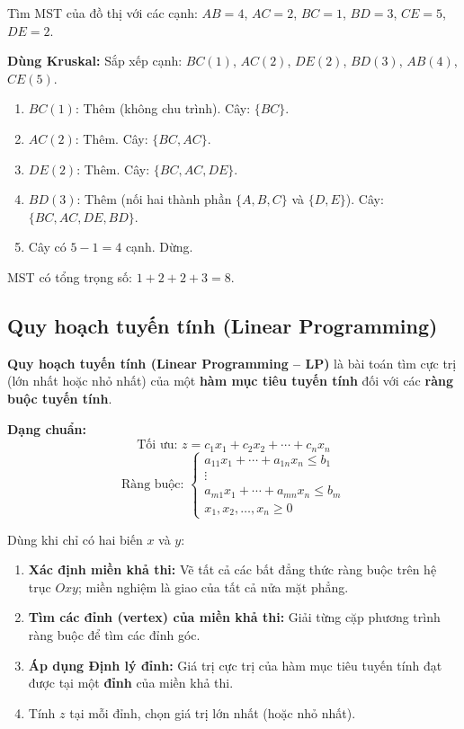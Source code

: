 \documentclass[12pt,a4paper]{article}
\begin{document}
\begin{vidu}
  Tìm MST của đồ thị với các cạnh: $AB=4$, $AC=2$, $BC=1$, $BD=3$, $CE=5$, $DE=2$.

  \medskip\textbf{Dùng Kruskal:}
  Sắp xếp cạnh: $BC(1)$, $AC(2)$, $DE(2)$, $BD(3)$, $AB(4)$, $CE(5)$.
  \begin{enumerate}
    \item $BC(1)$: Thêm (không chu trình). Cây: $\{BC\}$.
    \item $AC(2)$: Thêm. Cây: $\{BC, AC\}$.
    \item $DE(2)$: Thêm. Cây: $\{BC, AC, DE\}$.
    \item $BD(3)$: Thêm (nối hai thành phần $\{A,B,C\}$ và $\{D,E\}$). Cây: $\{BC, AC, DE, BD\}$.
    \item Cây có $5-1=4$ cạnh. Dừng.
  \end{enumerate}
  MST có tổng trọng số: $1+2+2+3 = 8$.
\end{vidu}

\subsection{Quy hoạch tuyến tính (Linear Programming)}

\begin{dinhnghia}[title={Bài toán quy hoạch tuyến tính}]
  \textbf{Quy hoạch tuyến tính (Linear Programming -- LP)} là bài toán tìm cực trị (lớn nhất hoặc nhỏ nhất) của một \textbf{hàm mục tiêu tuyến tính} đối với các \textbf{ràng buộc tuyến tính}.

  \textbf{Dạng chuẩn:}
  \[
    \text{Tối ưu: } z = c_1 x_1 + c_2 x_2 + \cdots + c_n x_n
  \]
  \[
    \text{Ràng buộc: } \begin{cases} a_{11}x_1 + \cdots + a_{1n}x_n \le b_1 \\ \vdots \\ a_{m1}x_1 + \cdots + a_{mn}x_n \le b_m \\ x_1, x_2, \ldots, x_n \ge 0 \end{cases}
  \]
\end{dinhnghia}

\begin{phuongphap}[title={Phương pháp đồ thị (cho 2 biến)}]
  Dùng khi chỉ có hai biến $x$ và $y$:
  \begin{enumerate}
    \item \textbf{Xác định miền khả thi:} Vẽ tất cả các bất đẳng thức ràng buộc trên hệ trục $Oxy$; miền nghiệm là giao của tất cả nửa mặt phẳng.
    \item \textbf{Tìm các đỉnh (vertex) của miền khả thi:} Giải từng cặp phương trình ràng buộc để tìm các đỉnh góc.
    \item \textbf{Áp dụng Định lý đỉnh:} Giá trị cực trị của hàm mục tiêu tuyến tính đạt được tại một \textbf{đỉnh} của miền khả thi.
    \item Tính $z$ tại mỗi đỉnh, chọn giá trị lớn nhất (hoặc nhỏ nhất).
  \end{enumerate}
\end{phuongphap}
\end{document}
